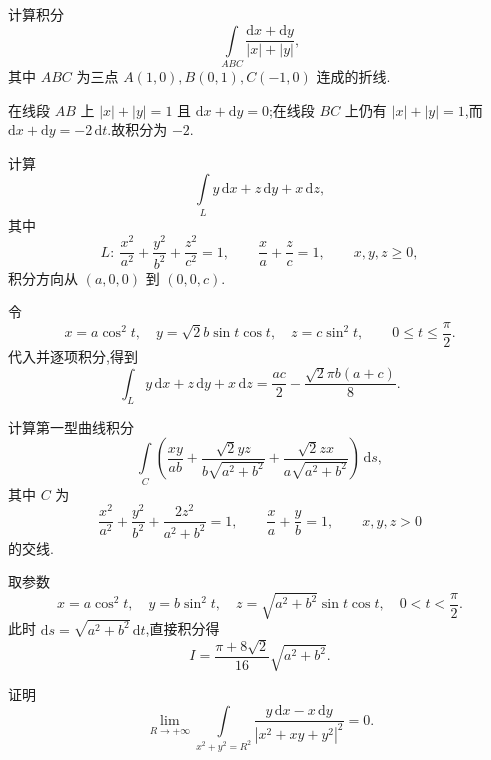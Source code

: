 \begin{example}
    计算积分
    \[
        \int\limits_{ABC}\dfrac{\mathrm{d}x+\mathrm{d}y}{|x|+|y|},
    \]
    其中 $ABC$ 为三点 $A(1,0),B(0,1),C(-1,0)$ 连成的折线.
\end{example}
\exampleblank

\begin{solution}
    在线段 $AB$ 上 $|x|+|y|=1$ 且 $\mathrm{d}x+\mathrm{d}y=0$;在线段 $BC$ 上仍有 $|x|+|y|=1$,而 $\mathrm{d}x+\mathrm{d}y=-2\,\mathrm{d}t$.故积分为 $-2$.
\end{solution}

\begin{example}
    计算
    \[
        \int\limits_L y\,\mathrm{d}x+z\,\mathrm{d}y+x\,\mathrm{d}z,
    \]
    其中
    \[
        L:\ \dfrac{x^2}{a^2}+\dfrac{y^2}{b^2}+\dfrac{z^2}{c^2}=1,
        \qquad \dfrac{x}{a}+\dfrac{z}{c}=1,
        \qquad x,y,z\geq0,
    \]
    积分方向从 $(a,0,0)$ 到 $(0,0,c)$.
\end{example}
\exampleblank

\begin{solution}
    令
    \[
        x=a\cos^2t,\quad y=\sqrt{2}b\sin t\cos t,\quad z=c\sin^2t,\qquad 0\leq t\leq\dfrac{\pi}{2}.
    \]
    代入并逐项积分,得到
    \[
        \int_Ly\,\mathrm{d}x+z\,\mathrm{d}y+x\,\mathrm{d}z
        =\dfrac{ac}{2}-\dfrac{\sqrt{2}\pi b(a+c)}{8}.
    \]
\end{solution}

\begin{example}
    计算第一型曲线积分
    \[
        \int\limits_C\left(
        \dfrac{xy}{ab}+\dfrac{\sqrt{2}yz}{b\sqrt{a^2+b^2}}+
        \dfrac{\sqrt{2}zx}{a\sqrt{a^2+b^2}}
        \right)\,\mathrm{d}s,
    \]
    其中 $C$ 为
    \[
        \dfrac{x^2}{a^2}+\dfrac{y^2}{b^2}+\dfrac{2z^2}{a^2+b^2}=1,
        \qquad \dfrac{x}{a}+\dfrac{y}{b}=1,
        \qquad x,y,z>0
    \]
    的交线.
\end{example}
\exampleblank

\begin{solution}
    取参数
    \[
        x=a\cos^2t,\quad y=b\sin^2t,\quad z=\sqrt{a^2+b^2}\sin t\cos t,\quad 0<t<\dfrac{\pi}{2}.
    \]
    此时 $\mathrm{d}s=\sqrt{a^2+b^2}\,\mathrm{d}t$,直接积分得
    \[
        I=\dfrac{\pi+8\sqrt{2}}{16}\sqrt{a^2+b^2}.
    \]
\end{solution}

\begin{example}
    证明
    \[
        \lim\limits_{R\to+\infty}
        \int\limits_{x^2+y^2=R^2}
        \dfrac{y\,\mathrm{d}x-x\,\mathrm{d}y}{|x^2+xy+y^2|^2}=0.
    \]
\end{example}
\exampleblank

